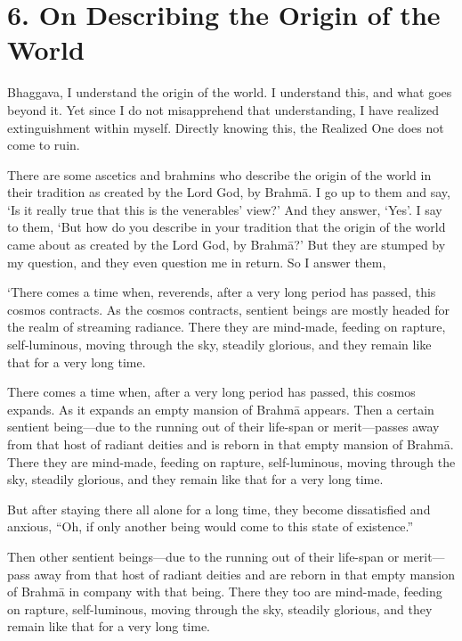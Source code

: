 \documentclass[12pt,openany]{book}%
\begin{document}
\section*{6. On Describing the Origin of the World }

Bhaggava, I understand the origin of the world. I understand this, and what goes beyond it. Yet since I do not misapprehend that understanding, I have realized extinguishment within myself. Directly knowing this, the Realized One does not come to ruin. 

There are some ascetics and brahmins who describe the origin of the world in their tradition as created by the Lord God, by \textsanskrit{Brahmā}. I go up to them and say, ‘Is it really true that this is the venerables’ view?’ And they answer, ‘Yes’. I say to them, ‘But how do you describe in your tradition that the origin of the world came about as created by the Lord God, by \textsanskrit{Brahmā}?’ But they are stumped by my question, and they even question me in return. So I answer them, 

‘There comes a time when, reverends, after a very long period has passed, this cosmos contracts. As the cosmos contracts, sentient beings are mostly headed for the realm of streaming radiance. There they are mind-made, feeding on rapture, self-luminous, moving through the sky, steadily glorious, and they remain like that for a very long time. 

There comes a time when, after a very long period has passed, this cosmos expands. As it expands an empty mansion of \textsanskrit{Brahmā} appears. Then a certain sentient being—due to the running out of their life-span or merit—passes away from that host of radiant deities and is reborn in that empty mansion of \textsanskrit{Brahmā}. There they are mind-made, feeding on rapture, self-luminous, moving through the sky, steadily glorious, and they remain like that for a very long time. 

But after staying there all alone for a long time, they become dissatisfied and anxious, “Oh, if only another being would come to this state of existence.” 

Then other sentient beings—due to the running out of their life-span or merit—pass away from that host of radiant deities and are reborn in that empty mansion of \textsanskrit{Brahmā} in company with that being. There they too are mind-made, feeding on rapture, self-luminous, moving through the sky, steadily glorious, and they remain like that for a very long time. 
\end{document}
